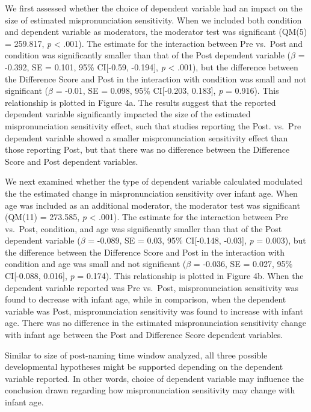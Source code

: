 \documentclass[man]{apa6}
\theoremstyle{definition}
\theoremstyle{definition}
\theoremstyle{definition}
\theoremstyle{remark}
\begin{document}
We first assessed whether the choice of dependent variable had an impact
on the size of estimated mispronunciation sensitivity. When we included
both condition and dependent variable as moderators, the moderator test
was significant (QM(5) = 259.817, \emph{p} \textless{} .001). The
estimate for the interaction between Pre vs.~Post and condition was
significantly smaller than that of the Post dependent variable
(\(\beta\) = -0.392, SE = 0.101, 95\% CI{[}-0.59, -0.194{]}, \emph{p}
\textless{} .001), but the difference between the Difference Score and
Post in the interaction with condition was small and not significant
(\(\beta\) = -0.01, SE = 0.098, 95\% CI{[}-0.203, 0.183{]}, \emph{p} =
0.916). This relationship is plotted in Figure 4a. The results suggest
that the reported dependent variable significantly impacted the size of
the estimated mispronunciation sensitivity effect, such that studies
reporting the Post. vs.~Pre dependent variable showed a smaller
mispronunciation sensitivity effect than those reporting Post, but that
there was no difference between the Difference Score and Post dependent
variables.

We next examined whether the type of dependent variable calculated
modulated the the estimated change in mispronunciation sensitivity over
infant age. When age was included as an additional moderator, the
moderator test was significant (QM(11) = 273.585, \emph{p} \textless{}
.001). The estimate for the interaction between Pre vs.~Post, condition,
and age was significantly smaller than that of the Post dependent
variable (\(\beta\) = -0.089, SE = 0.03, 95\% CI{[}-0.148, -0.03{]},
\emph{p} = 0.003), but the difference between the Difference Score and
Post in the interaction with condition and age was small and not
significant (\(\beta\) = -0.036, SE = 0.027, 95\% CI{[}-0.088, 0.016{]},
\emph{p} = 0.174). This relationship is plotted in Figure 4b. When the
dependent variable reported was Pre vs.~Post, mispronunciation
sensitivity was found to decrease with infant age, while in comparison,
when the dependent variable was Post, mispronunciation sensitivity was
found to increase with infant age. There was no difference in the
estimated mispronunciation sensitivity change with infant age between
the Post and Difference Score dependent variables.

Similar to size of post-naming time window analyzed, all three possible
developmental hypotheses might be supported depending on the dependent
variable reported. In other words, choice of dependent variable may
influence the conclusion drawn regarding how mispronunciation
sensitivity may change with infant age.
\end{document}
